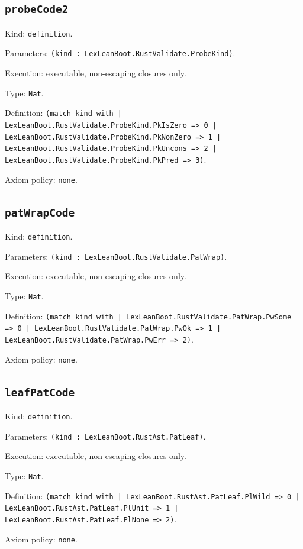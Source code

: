 \documentclass[11pt]{article}
\begin{document}
\subsection*{\texttt{probeCode2}}
\noindent Kind: \texttt{definition}.\par
\noindent Parameters: \texttt{(kind : LexLeanBoot.RustValidate.ProbeKind)}.\par
\noindent Execution: executable, non-escaping closures only.\par
\noindent Type: \texttt{Nat}.\par
\noindent Definition: \texttt{(match kind with | LexLeanBoot.RustValidate.ProbeKind.PkIsZero => 0 | LexLeanBoot.RustValidate.ProbeKind.PkNonZero => 1 | LexLeanBoot.RustValidate.ProbeKind.PkUncons => 2 | LexLeanBoot.RustValidate.ProbeKind.PkPred => 3)}.\par
\noindent Axiom policy: \texttt{none}.\par
\subsection*{\texttt{patWrapCode}}
\noindent Kind: \texttt{definition}.\par
\noindent Parameters: \texttt{(kind : LexLeanBoot.RustValidate.PatWrap)}.\par
\noindent Execution: executable, non-escaping closures only.\par
\noindent Type: \texttt{Nat}.\par
\noindent Definition: \texttt{(match kind with | LexLeanBoot.RustValidate.PatWrap.PwSome => 0 | LexLeanBoot.RustValidate.PatWrap.PwOk => 1 | LexLeanBoot.RustValidate.PatWrap.PwErr => 2)}.\par
\noindent Axiom policy: \texttt{none}.\par
\subsection*{\texttt{leafPatCode}}
\noindent Kind: \texttt{definition}.\par
\noindent Parameters: \texttt{(kind : LexLeanBoot.RustAst.PatLeaf)}.\par
\noindent Execution: executable, non-escaping closures only.\par
\noindent Type: \texttt{Nat}.\par
\noindent Definition: \texttt{(match kind with | LexLeanBoot.RustAst.PatLeaf.PlWild => 0 | LexLeanBoot.RustAst.PatLeaf.PlUnit => 1 | LexLeanBoot.RustAst.PatLeaf.PlNone => 2)}.\par
\noindent Axiom policy: \texttt{none}.\par
\end{document}
